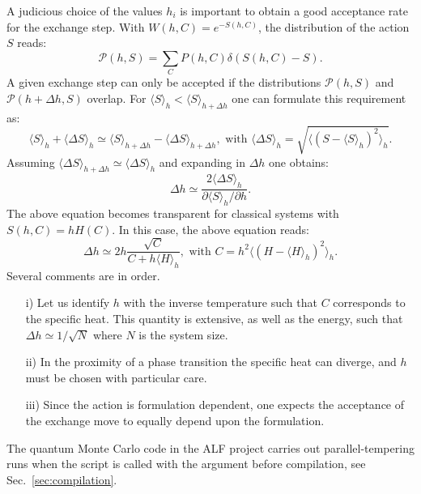 A judicious choice of the values $h_i$ is important to obtain a good acceptance rate for the exchange step.  With  $W(h,C)  = e^{- S(h,C) }$, the  distribution of the action $S$  reads:
\begin{equation}
	 \mathcal{P}( h, S ) =   \sum_{C}     P( h,C )   \delta ( S(h,C) -  S ). 
\end{equation}
A given exchange step can only be accepted if the distributions $\mathcal{P}(h,S)$ and $\mathcal{P}(h+\Delta h, S)$ overlap. For 
$\langle S \rangle_{h}  < \langle S \rangle_{h +  \Delta h} $   one can formulate this  requirement as:
\begin{equation}
	\langle S \rangle_{h}  +\langle \Delta S \rangle_{h}   \simeq \langle S \rangle_{h +  \Delta h}  - \langle \Delta S \rangle_{h + \Delta h} ,  \text{    with   }   
\langle \Delta S \rangle_{h}   =  \sqrt{ \langle \left(    S -  \langle S   \rangle_h  	\right)^2 \rangle_h} .
\end{equation}
Assuming  $ \langle \Delta S \rangle_{h + \Delta h}  \simeq \langle \Delta S \rangle_{h} $  and expanding in $\Delta h$ one obtains: 
\begin{equation}
	\Delta h \simeq \frac{ 2  \langle \Delta S \rangle_{h}    }{ \partial \langle S \rangle_{h} / \partial h}.  
\end{equation} 
The above equation becomes transparent  for  classical systems  with $ S(h,C) =  h H(C) $.  In this case, the above equation reads: 
\begin{equation}
	\Delta h       \simeq  2 h \frac{  \sqrt{C} } { C    + h \langle H \rangle_h},  \text{   with  } C = h^2    \langle \left(  H -  \langle H   \rangle_h \right)^2 \rangle_h .
\end{equation} 
Several comments are in order.
\begin{itemize}
\item[i)] Let us identify $h$ with the inverse temperature  such that $C$ corresponds to the specific heat. This quantity is extensive,  as well as the energy, such that $ \Delta h \simeq 1/{\sqrt{N}} $ where $N$ is the system size.
\item[ii)] In the proximity of a phase transition the specific heat can diverge, and $h$ must be chosen with particular care.
\item[iii)]  Since the action is formulation dependent, one expects the acceptance of the  exchange move to equally depend  upon the formulation. 
\end{itemize}
The quantum Monte Carlo code in the ALF project carries out parallel-tempering runs when the script  is called with the argument  before compilation, see Sec.~\ref{sec:compilation}.
